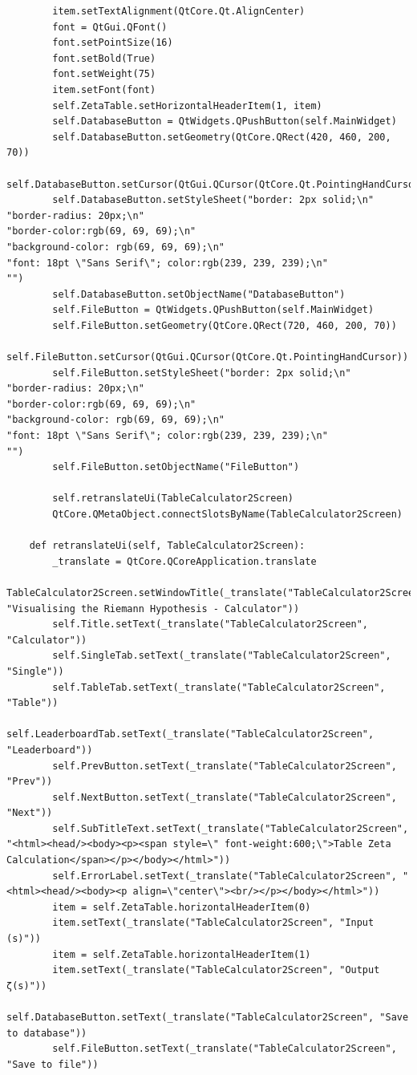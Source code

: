 \documentclass{article}
\begin{document}
\begin{lstlisting}
        item.setTextAlignment(QtCore.Qt.AlignCenter)
        font = QtGui.QFont()
        font.setPointSize(16)
        font.setBold(True)
        font.setWeight(75)
        item.setFont(font)
        self.ZetaTable.setHorizontalHeaderItem(1, item)
        self.DatabaseButton = QtWidgets.QPushButton(self.MainWidget)
        self.DatabaseButton.setGeometry(QtCore.QRect(420, 460, 200, 70))
        self.DatabaseButton.setCursor(QtGui.QCursor(QtCore.Qt.PointingHandCursor))
        self.DatabaseButton.setStyleSheet("border: 2px solid;\n"
"border-radius: 20px;\n"
"border-color:rgb(69, 69, 69);\n"
"background-color: rgb(69, 69, 69);\n"
"font: 18pt \"Sans Serif\"; color:rgb(239, 239, 239);\n"
"")
        self.DatabaseButton.setObjectName("DatabaseButton")
        self.FileButton = QtWidgets.QPushButton(self.MainWidget)
        self.FileButton.setGeometry(QtCore.QRect(720, 460, 200, 70))
        self.FileButton.setCursor(QtGui.QCursor(QtCore.Qt.PointingHandCursor))
        self.FileButton.setStyleSheet("border: 2px solid;\n"
"border-radius: 20px;\n"
"border-color:rgb(69, 69, 69);\n"
"background-color: rgb(69, 69, 69);\n"
"font: 18pt \"Sans Serif\"; color:rgb(239, 239, 239);\n"
"")
        self.FileButton.setObjectName("FileButton")

        self.retranslateUi(TableCalculator2Screen)
        QtCore.QMetaObject.connectSlotsByName(TableCalculator2Screen)

    def retranslateUi(self, TableCalculator2Screen):
        _translate = QtCore.QCoreApplication.translate
        TableCalculator2Screen.setWindowTitle(_translate("TableCalculator2Screen", "Visualising the Riemann Hypothesis - Calculator"))
        self.Title.setText(_translate("TableCalculator2Screen", "Calculator"))
        self.SingleTab.setText(_translate("TableCalculator2Screen", "Single"))
        self.TableTab.setText(_translate("TableCalculator2Screen", "Table"))
        self.LeaderboardTab.setText(_translate("TableCalculator2Screen", "Leaderboard"))
        self.PrevButton.setText(_translate("TableCalculator2Screen", "Prev"))
        self.NextButton.setText(_translate("TableCalculator2Screen", "Next"))
        self.SubTitleText.setText(_translate("TableCalculator2Screen", "<html><head/><body><p><span style=\" font-weight:600;\">Table Zeta Calculation</span></p></body></html>"))
        self.ErrorLabel.setText(_translate("TableCalculator2Screen", "<html><head/><body><p align=\"center\"><br/></p></body></html>"))
        item = self.ZetaTable.horizontalHeaderItem(0)
        item.setText(_translate("TableCalculator2Screen", "Input (s)"))
        item = self.ZetaTable.horizontalHeaderItem(1)
        item.setText(_translate("TableCalculator2Screen", "Output ζ(s)"))
        self.DatabaseButton.setText(_translate("TableCalculator2Screen", "Save to database"))
        self.FileButton.setText(_translate("TableCalculator2Screen", "Save to file"))
\end{lstlisting}
\end{document}
